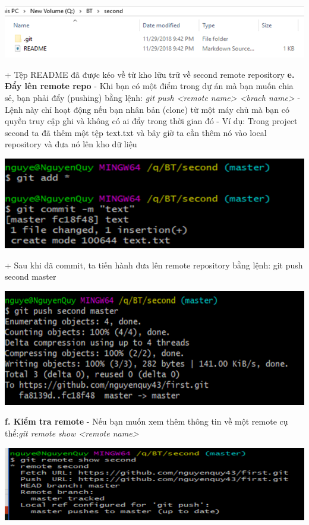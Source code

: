 \documentclass[12pt,a4paper]{report}
\begin{document}
	\includegraphics[width=0.8\linewidth]{screenshot037}

	\label{fig:screenshot037}
\vskip 0.4cm\vskip 0.4cm
+ Tệp README đã được kéo về từ kho lữu trữ về second remote repository\vskip 0.4cm
{\bf e. Đẩy lên remote repo} \vskip 0.4cm
- Khi bạn có một điểm trong dự án mà bạn muốn chia sẻ, bạn phải đẩy (pushing) bằng lệnh: {\it git push <remote name> <brach name> }\vskip 0.4cm
- Lệnh này chỉ hoạt động nếu bạn nhân bản (clone) từ một máy chủ mà bạn có quyền truy cập ghi và không có ai đẩy trong thời gian đó\vskip 0.4cm
- Ví dụ: Trong project second ta đã thêm một tệp text.txt và bây giờ ta cần thêm nó vào local repository và đưa nó lên kho dữ liệu\vskip 0.4cm

	\includegraphics[width=0.8\linewidth]{screenshot038}

	\label{fig:screenshot038}
\vskip 0.4cm\vskip 0.4cm
+ Sau khi đã commit, ta tiến hành đưa lên remote repository bằng lệnh: git push second master
\vskip 0.4cm

	\includegraphics[width=0.8\linewidth]{screenshot039}

	\label{fig:screenshot039}
\vskip 0.4cm\vskip 0.4cm
{\bf f. Kiểm tra remote} \vskip 0.4cm
- Nếu bạn muốn xem thêm thông tin về một remote cụ thể:{\it git remote show <remote name>}\vskip 0.4cm


	\includegraphics[width=0.8\linewidth]{screenshot040}
\end{document}
